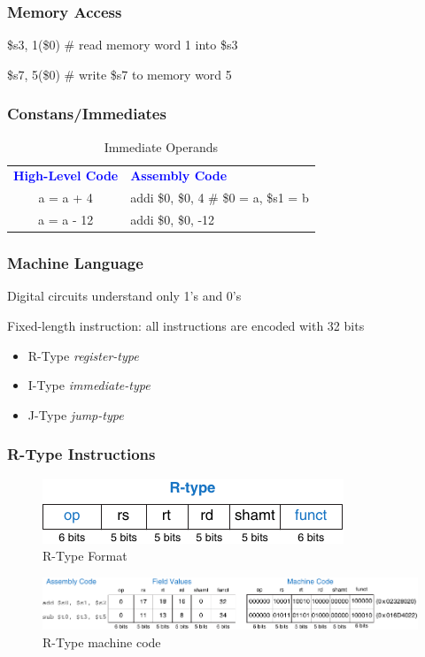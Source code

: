 \documentclass[xcolor={table, dvipsnames}]{beamer}
\newcommand\boldblue[1]{\textcolor{blue}{\textbf{#1}}}
\begin{document}
 \begin{frame}
 \frametitle{Memory Access}
 \begin{example}
\$s3, 1(\$0) \# read memory word 1 into \$s3
\newline

\$s7, 5(\$0) \# write \$s7 to memory word 5
 \end{example}
 \end{frame}
 
 \begin{frame}
 \frametitle{Constans/Immediates}
 \begin{table}[h!]
\centering
 \begin{tabular}{| c p{6cm} |} 
\hline
 \boldblue{High-Level Code}  & \boldblue{Assembly Code}   \\ 
 a = a + 4 & addi \$0, \$0, 4 \# \$0 = a, \$s1 = b \\ 
 a = a - 12 & addi \$0, \$0, -12 \\
 \hline
\end{tabular}
\caption{Immediate Operands}
\end{table}
 \end{frame}
 
 \begin{frame}
 \frametitle{Machine Language}
 Digital circuits understand only 1’s and 0’s \newline
 
 Fixed-length instruction: all instructions are encoded with 32 bits \newline
 \begin{itemize}
 \item
R-Type \textit{register-type}
\item
I-Type \textit{immediate-type}
\item
J-Type \textit{jump-type}
\end{itemize}  
 \end{frame}
 
\begin{frame}
\frametitle{R-Type Instructions}
 \begin{figure}
 \includegraphics{img/r-type-instruction.pdf}
 \caption{R-Type Format}
 \end{figure}
  \begin{figure}
 \includegraphics[scale=0.8]{img/r-type-machine-code.pdf}
 \caption{R-Type machine code}
 \end{figure}
\end{frame}
\end{document}
